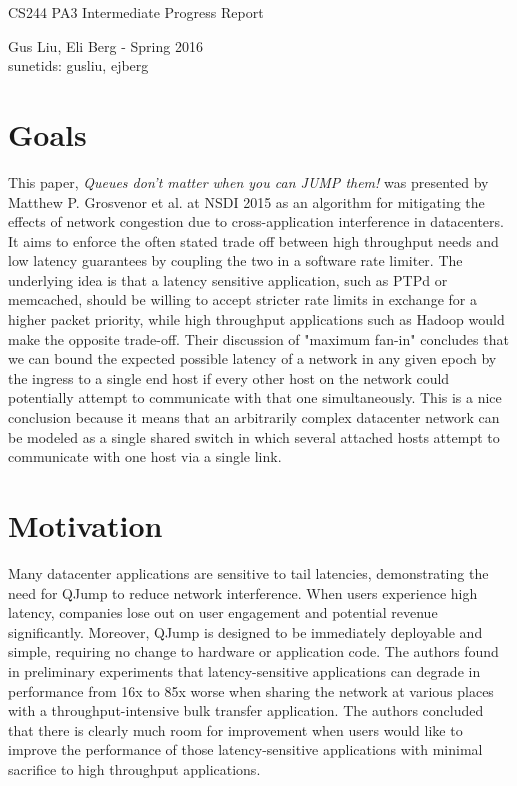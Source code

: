 \documentclass[12pt]{article}
\begin{document}
\begin{center}
{\Large CS244 PA3 Intermediate Progress Report}
\begin{center}
Gus Liu, Eli Berg - Spring 2016 \\
sunetids: gusliu, ejberg
\end{center} 
\end{center}

\section*{Goals}	
	This paper, \textit{Queues don't matter when you can JUMP them!} was presented by Matthew P. Grosvenor et al. at NSDI 2015 as an algorithm for mitigating the effects of network congestion due to cross-application interference in datacenters. It aims to enforce the often stated trade off between high throughput needs and low latency guarantees by coupling the two in a software rate limiter. The underlying idea is that a latency sensitive application, such as PTPd or memcached, should be willing to accept stricter rate limits in exchange for a higher packet priority, while high throughput applications such as Hadoop would make the opposite trade-off. Their discussion of "maximum fan-in" concludes that we can bound the expected possible latency of a network in any given epoch by the ingress to a single end host if every other host on the network could potentially attempt to communicate with that one simultaneously. This is a nice conclusion because it means that an arbitrarily complex datacenter network can be modeled as a single shared switch in which several attached hosts attempt to communicate with one host via a single link. 

\section*{Motivation}
	Many datacenter applications are sensitive to tail latencies, demonstrating the need for QJump to reduce network interference. When users experience high latency, companies lose out on user engagement and potential revenue significantly. Moreover, QJump is designed to be immediately deployable and simple, requiring no change to hardware or application code. The authors found in preliminary experiments that latency-sensitive applications can degrade in performance from 16x to 85x worse when sharing the network at various places with a throughput-intensive bulk transfer application. The authors concluded that there is clearly much room for improvement when users would like to improve the performance of those latency-sensitive applications with minimal sacrifice to high throughput applications.
	
\end{document}
